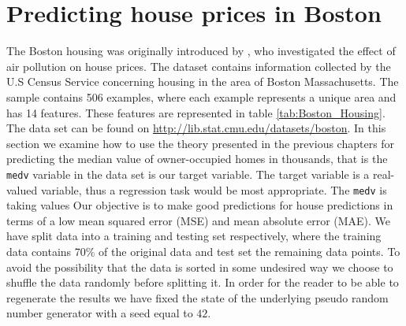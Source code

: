 \section{Predicting house prices in Boston} \label{sec:Boston_housing}
The Boston housing was originally introduced by \cite{HARRISON197881}, who investigated the effect of air pollution on house prices. 
The dataset contains information collected by the U.S Census Service concerning housing in the area of Boston Massachusetts. The sample contains 506 examples, where each example represents a unique area and has 14 features. These features are represented in table \ref{tab:Boston_Housing}. The data set can be found on \href{http://lib.stat.cmu.edu/datasets/boston}{http://lib.stat.cmu.edu/datasets/boston}. In this section we examine how to use the theory presented in the previous chapters for predicting the median value of owner-occupied homes in thousands, that is the \texttt{medv} variable in the data set is our target variable. The target variable is a real-valued variable, thus a regression task would be most appropriate.   
The \texttt{medv} is taking values  Our objective is to make good predictions for house predictions in terms of a low mean squared error (MSE) and mean absolute error (MAE). We have split data into a training and testing set respectively, where the training data contains 70\% of the original data and test set the remaining data points. To avoid the possibility that the data is sorted in some undesired way we choose to shuffle the data randomly before splitting it. In order for the reader to be able to regenerate the results we have fixed the state of the underlying pseudo random number generator with a seed equal to $42$. 



